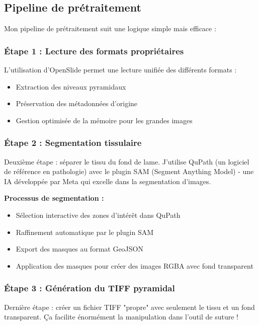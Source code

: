 \documentclass[11pt,a4paper]{report}
\begin{document}
\subsection{Pipeline de prétraitement}

Mon pipeline de prétraitement suit une logique simple mais efficace :

\subsubsection{Étape 1 : Lecture des formats propriétaires}

L'utilisation d'OpenSlide permet une lecture unifiée des différents formats :

\begin{itemize}
\item Extraction des niveaux pyramidaux
\item Préservation des métadonnées d'origine
\item Gestion optimisée de la mémoire pour les grandes images
\end{itemize}

\subsubsection{Étape 2 : Segmentation tissulaire}

Deuxième étape : séparer le tissu du fond de lame. J'utilise QuPath (un logiciel de référence en pathologie) avec le plugin SAM (Segment Anything Model) - une IA développée par Meta qui excelle dans la segmentation d'images.

\textbf{Processus de segmentation :}
\begin{itemize}
\item Sélection interactive des zones d'intérêt dans QuPath
\item Raffinement automatique par le plugin SAM
\item Export des masques au format GeoJSON
\item Application des masques pour créer des images RGBA avec fond transparent
\end{itemize}

\subsubsection{Étape 3 : Génération du TIFF pyramidal}

Dernière étape : créer un fichier TIFF "propre" avec seulement le tissu et un fond transparent. Ça facilite énormément la manipulation dans l'outil de suture !
\end{document}
